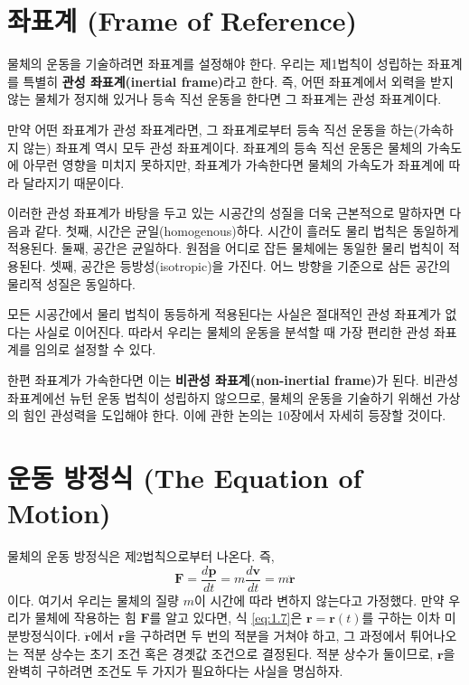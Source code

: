 \documentclass[chapter, oneside, b5paper]{oblivoir}
\theoremstyle{plain}
\theoremstyle{definition}
\theoremstyle{remark}
\begin{document}
\section{좌표계 (Frame of Reference)}
물체의 운동을 기술하려면 좌표계를 설정해야 한다. 우리는 제1법칙이 성립하는 좌표계를 특별히 \textbf{관성 좌표계(inertial frame)}라고 한다. 즉, 어떤 좌표계에서 외력을 받지 않는 물체가 정지해 있거나 등속 직선 운동을 한다면 그 좌표계는 관성 좌표계이다.

만약 어떤 좌표계가 관성 좌표계라면, 그 좌표계로부터 등속 직선 운동을 하는(가속하지 않는) 좌표계 역시 모두 관성 좌표계이다. 좌표계의 등속 직선 운동은 물체의 가속도에 아무런 영향을 미치지 못하지만, 좌표계가 가속한다면 물체의 가속도가 좌표계에 따라 달라지기 때문이다.

이러한 관성 좌표계가 바탕을 두고 있는 시공간의 성질을 더욱 근본적으로 말하자면 다음과 같다. 첫째, 시간은 균일(homogenous)하다. 시간이 흘러도 물리 법칙은 동일하게 적용된다. 둘째, 공간은 균일하다. 원점을 어디로 잡든 물체에는 동일한 물리 법칙이 적용된다. 셋째, 공간은 등방성(isotropic)을 가진다. 어느 방향을 기준으로 삼든 공간의 물리적 성질은 동일하다.

모든 시공간에서 물리 법칙이 동등하게 적용된다는 사실은 절대적인 관성 좌표계가 없다는 사실로 이어진다. 따라서 우리는 물체의 운동을 분석할 때 가장 편리한 관성 좌표계를 임의로 설정할 수 있다.

한편 좌표계가 가속한다면 이는 \textbf{비관성 좌표계(non-inertial frame)}가 된다. 비관성 좌표계에선 뉴턴 운동 법칙이 성립하지 않으므로, 물체의 운동을 기술하기 위해선 가상의 힘인 관성력을 도입해야 한다. 이에 관한 논의는 10장에서 자세히 등장할 것이다.

\section{운동 방정식 (The Equation of Motion)}
물체의 운동 방정식은 제2법칙으로부터 나온다. 즉,
\begin{equation}
     \mathbf{F} = \frac{d\mathbf{p}}{dt} =  m\frac{d\mathbf{v}}{dt} = m\mathbf{\ddot{r}} \label{eq:1.7}
\end{equation}
이다. 여기서 우리는 물체의 질량 $m$이 시간에 따라 변하지 않는다고 가정했다. 만약 우리가 물체에 작용하는 힘 $\mathbf{F}$를 알고 있다면, 식 \ref{eq:1.7}은 $\mathbf{r}=\mathbf{r}(t)$를 구하는 이차 미분방정식이다. $\mathbf{\ddot{r}}$에서 $\mathbf{r}$을 구하려면 두 번의 적분을 거쳐야 하고, 그 과정에서 튀어나오는 적분 상수는 초기 조건 혹은 경곗값 조건으로 결정된다. 적분 상수가 둘이므로, $\mathbf{r}$을 완벽히 구하려면 조건도 두 가지가 필요하다는 사실을 명심하자.
\end{document}
